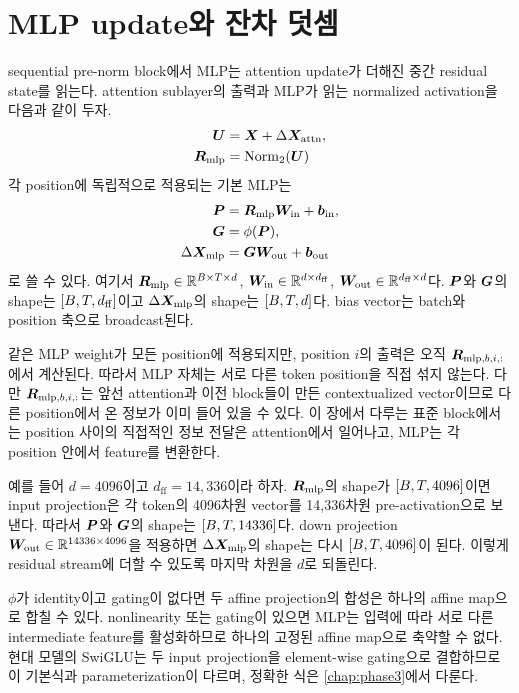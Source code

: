 \section{MLP update와 잔차 덧셈}

sequential pre-norm block에서 MLP는 attention update가 더해진 중간 residual state를 읽는다.
attention sublayer의 출력과 MLP가 읽는 normalized activation을 다음과 같이 두자.
\begin{align}
  \bm{U}
  &=\bm{X}+\Delta\bm{X}_{\mathrm{attn}},\\
  \bm{R}_{\mathrm{mlp}}
  &=\operatorname{Norm}_{2}(\bm{U})
\end{align}
각 position에 독립적으로 적용되는 기본 MLP는
\begin{align}
  \bm{P}
  &=\bm{R}_{\mathrm{mlp}}\bm{W}_{\mathrm{in}}+\bm{b}_{\mathrm{in}},\\
  \bm{G}
  &=\phi(\bm{P}),\\
  \Delta\bm{X}_{\mathrm{mlp}}
  &=\bm{G}\bm{W}_{\mathrm{out}}+\bm{b}_{\mathrm{out}}
\end{align}
로 쓸 수 있다.
여기서 $\bm{R}_{\mathrm{mlp}}\in\mathbb{R}^{B\times T\times d}$, $\bm{W}_{\mathrm{in}}\in\mathbb{R}^{d\times d_{\mathrm{ff}}}$, $\bm{W}_{\mathrm{out}}\in\mathbb{R}^{d_{\mathrm{ff}}\times d}$다.
$\bm{P}$와 $\bm{G}$의 shape는 $\left[B,T,d_{\mathrm{ff}}\right]$이고 $\Delta\bm{X}_{\mathrm{mlp}}$의 shape는 $\left[B,T,d\right]$다.
bias vector는 batch와 position 축으로 broadcast된다.

같은 MLP weight가 모든 position에 적용되지만, position $i$의 출력은 오직 $\bm{R}_{\mathrm{mlp},b,i,:}$에서 계산된다.
따라서 MLP 자체는 서로 다른 token position을 직접 섞지 않는다.
다만 $\bm{R}_{\mathrm{mlp},b,i,:}$는 앞선 attention과 이전 block들이 만든 contextualized vector이므로 다른 position에서 온 정보가 이미 들어 있을 수 있다.
이 장에서 다루는 표준 block에서는 position 사이의 직접적인 정보 전달은 attention에서 일어나고, MLP는 각 position 안에서 feature를 변환한다.

예를 들어 $d=4096$이고 $d_{\mathrm{ff}}=14{,}336$이라 하자.
$\bm{R}_{\mathrm{mlp}}$의 shape가 $\left[B,T,4096\right]$이면 input projection은 각 token의 4096차원 vector를 14,336차원 pre-activation으로 보낸다.
따라서 $\bm{P}$와 $\bm{G}$의 shape는 $\left[B,T,14336\right]$다.
down projection $\bm{W}_{\mathrm{out}}\in\mathbb{R}^{14336\times4096}$을 적용하면 $\Delta\bm{X}_{\mathrm{mlp}}$의 shape는 다시 $\left[B,T,4096\right]$이 된다.
이렇게 residual stream에 더할 수 있도록 마지막 차원을 $d$로 되돌린다.

$\phi$가 identity이고 gating이 없다면 두 affine projection의 합성은 하나의 affine map으로 합칠 수 있다.
nonlinearity 또는 gating이 있으면 MLP는 입력에 따라 서로 다른 intermediate feature를 활성화하므로 하나의 고정된 affine map으로 축약할 수 없다.
현대 모델의 SwiGLU는 두 input projection을 element-wise gating으로 결합하므로 이 기본식과 parameterization이 다르며, 정확한 식은 \cref{chap:phase3}에서 다룬다.

